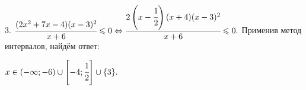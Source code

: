 3. $\cfrac{(2x^2+7x-4)(x-3)^2}{x+6}\leqslant0\Leftrightarrow\cfrac{2\left(x-\cfrac{1}{2}\right)(x+4)(x-3)^2}{x+6}\leqslant0.$ Применив метод интервалов, найдём ответ:
\begin{figure}[ht!]
\end{figure}
$x\in(-\infty; -6)\cup\left[-4;\cfrac{1}{2}\right]\cup\{3\}.$\\
